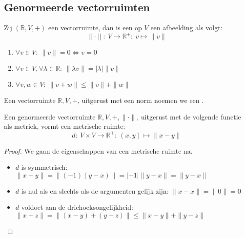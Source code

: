 \documentclass[main.tex]{subfiles}
\begin{document}
\subsection{Genormeerde vectorruimten}
\label{sec:genorm-vect}

\begin{de}
  \label{de:norm}
  Zij $(\mathbb{R},V,+)$ een vectorruimte, dan is een  op $V$ een afbeelding als volgt:
  \[ \|\cdot\|:\ V \rightarrow \mathbb{R}^{+}:\ v \mapsto \|v\| \]
  \begin{enumerate}
  \item $\forall v\in V:\ \|v\| = 0 \Leftrightarrow v=0$
  \item $\forall v\in V, \forall \lambda \in \mathbb{R}:\ \|\lambda v\| = |\lambda|\|v\|$
  \item $\forall v,w\in V:\ \|v+w\| \le \|v\| + \|w\|$
  \end{enumerate}
\end{de}

\begin{de}
  Een vectorruimte $\mathbb{R},V,+$, uitgerust met een norm noemen we een .
\end{de}

\begin{st}
  Een genormeerde vectorruimte $\mathbb{R},V,+,\|\cdot\|$, uitgerust met de volgende functie als metriek, vormt een metrische ruimte:
  \[ d:\ V \times V \rightarrow \mathbb{R}^{+}:\ (x,y) \mapsto \|x-y\| \]

  \begin{proof}
    We gaan de eigenschappen van een metrische ruimte na.
    \begin{itemize}
    \item $d$ is symmetrisch: $\|x-y\| = \|(-1)(y-x)\| = |-1|\|y-x\| = \|y-x\|$
    \item $d$ is nul als en slechts als de argumenten gelijk zijn: $\|x-x\| = \|0\| = 0$
    \item $d$ voldoet aan de driehoeksongelijkheid: $\| x-z \| = \| (x-y)+(y-z) \| \le \|x-y\| + \| y-z \|$
    \end{itemize}
  \end{proof}
\end{st}
\end{document}
